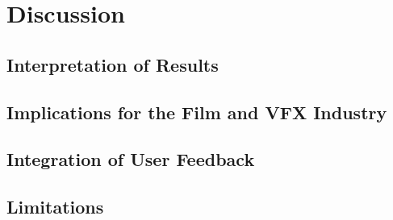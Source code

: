 %
\chapter{Discussion}
\label{sec:discussion}


\section{Interpretation of Results}
\label{sec:discussion:results}

\section{Implications for the Film and VFX Industry}
\label{sec:discussion:implications}

\section{Integration of User Feedback}
\label{sec:discussion:user-feedback}

\section{Limitations}
\label{sec:discussion:limitations}
